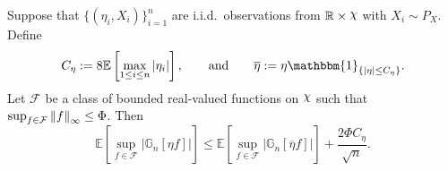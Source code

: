 \begin{lemma}\label{lem:TruncatedMaximal}
Suppose that $\{(\eta_i,X_i)\}_{i=1}^n$ are i.i.d.~observations from $\R \times \rchi$ with $X_i \sim P_X$. Define
\[
C_{\eta} := 8\mathbb{E}\left[\max_{1\le i\le n}|\eta_i|\right],\qquad\mbox{and}\qquad \overline{\eta} := \eta\mathbbm{1}_{\{|\eta| \le C_{\eta}\}}.
\] Let $\mathcal{F}$ be a class of bounded real-valued functions on $\rchi$ such that $\sup_{f\in\mathcal{F}}\left\lVert f\right\rVert_{\infty} \le \Phi$.  Then
\begin{equation}\label{eq:UnboundedToBounded1}
\mathbb{E}\left[\sup_{f\in\mathcal{F}}\left|\mathbb{G}_n\left[\eta f\right]\right|\right] \le \mathbb{E}\left[\sup_{f\in\mathcal{F}}\left|\mathbb{G}_n\left[\overline{\eta} f\right]\right|\right] + \frac{2\Phi C_{\eta}}{\sqrt{n}}.
\end{equation}
\end{lemma}
